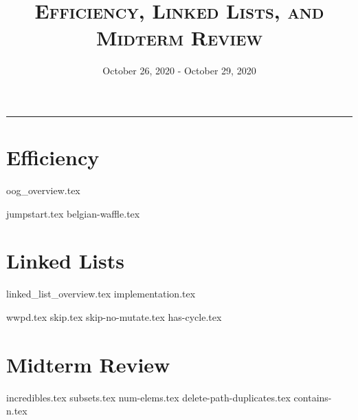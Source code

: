 \documentclass{exam}
\title{\textsc{Efficiency, Linked Lists, and Midterm Review}}
\date{October 26, 2020 - October 29, 2020}
\begin{document}
\maketitle
\rule{\textwidth}{0.15em}
\fontsize{12}{15}\selectfont

\section{Efficiency}
{oog_overview.tex}
\begin{questions}
{jumpstart.tex}
{belgian-waffle.tex}
\end{questions}

\section{Linked Lists}
{linked_list_overview.tex}
{implementation.tex}
\newpage
\begin{questions}
{wwpd.tex}
\newpage
{skip.tex}
{skip-no-mutate.tex}
{has-cycle.tex}
\end{questions}

\newpage
\section{Midterm Review}
\begin{questions}
{incredibles.tex}
{subsets.tex}
\newpage
{num-elems.tex}
\newpage
{delete-path-duplicates.tex}
{contains-n.tex}
\end{questions}
\end{document}
